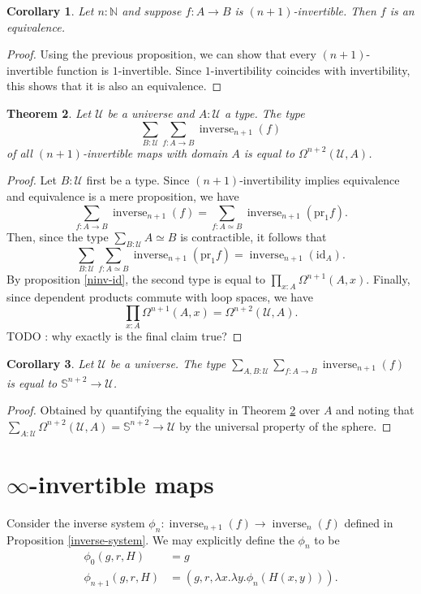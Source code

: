 \documentclass{article}
\theoremstyle{plain}
\newtheorem{theorem}{Theorem}
\newtheorem{corollary}[theorem]{Corollary}
\theoremstyle{definition}
\theoremstyle{remark}
\newcommand{\id}{\mathrm{id}}
\newcommand{\pr}{\mathrm{pr}}
\newcommand{\nsphere}[1]{\mathbb{S}^{#1}}
\newcommand{\U}{\mathcal{U}}
\newcommand{\N}{\mathbb{N}}
\newcommand{\lspace}[1]{\Omega^{#1}}
\DeclareMathOperator{\inverse}{inverse}
\newcommand{\ninverse}[1]{\inverse_{#1}}
\begin{document}
\begin{corollary}
  Let \(n : \N\) and suppose \(f : A \to B\) is \((n + 1)\)-invertible. Then \(f\) is an
  equivalence.
\end{corollary}

\begin{proof}
  Using the previous proposition, we can show that every \((n + 1)\)-invertible function is
  \(1\)-invertible. Since \(1\)-invertibility coincides with invertibility, this shows that
  it is also an equivalence.
\end{proof}

\begin{theorem}
  \label{ninv-maps-with-domain}
  Let \(\U\) be a universe and \(A : \U\) a type. The type
  \[\sum_{B : \U}\sum_{f : A \to B}\inverse_{n + 1}(f)\] of all \((n + 1)\)-invertible maps
  with domain \(A\) is equal to
  \(\lspace{n + 2}(\U, A)\).
\end{theorem}

\begin{proof}
  Let \(B : \U\) first be a type. Since \((n + 1)\)-invertibility implies equivalence and
  equivalence is a mere proposition, we have
  \[\sum_{f : A \to B}\ninverse{n + 1}(f) = \sum_{f : A \simeq B}\ninverse{n + 1}(\pr_{1}f).\]
  Then, since the type \(\sum_{B : \U}{A \simeq B}\) is contractible, it follows that
  \[\sum_{B : \U}\sum_{f : A \simeq B}\ninverse{n + 1}(\pr_{1}f) =
    \ninverse{n + 1}{(\id_{A})}.\]
  By proposition \ref{ninv-id}, the second type is equal to
  \(\prod_{x : A}\lspace{n + 1}(A, x)\). Finally, since dependent products commute with loop
  spaces, we have
  \[\prod_{x : A}\lspace{n + 1}(A, x) = \lspace{n + 2}(\U, A).\]
  TODO : why exactly is the final claim true?
\end{proof}

\begin{corollary}
  Let \(\U\) be a universe. The type
  \(\sum_{A, B : \U}\sum_{f : A \to B}\ninverse{n + 1}(f)\) is equal to
  \(\nsphere{n + 2} \to \U\).
\end{corollary}

\begin{proof}
  Obtained by quantifying the equality in Theorem \ref{ninv-maps-with-domain} over \(A\)
  and noting
  that \(\sum_{A : \U}\lspace{n + 2}(\U, A) = \nsphere{n + 2} \to \U\) by the universal
  property of the sphere.
\end{proof}

\section{\(\infty\)-invertible maps}

Consider the inverse system \(\phi_{n} : \ninverse{n + 1}(f) \to \ninverse{n}(f)\) defined
in Proposition \ref{inverse-system}. We may explicitly define the \(\phi_{n}\) to be
\begin{align*}
  \phi_{0}(g, r, H)     &= g \\
  \phi_{n + 1}(g, r, H) &= (g, r, \lambda x.\lambda y.\phi_{n}(H(x, y))).
\end{align*}
\end{document}
